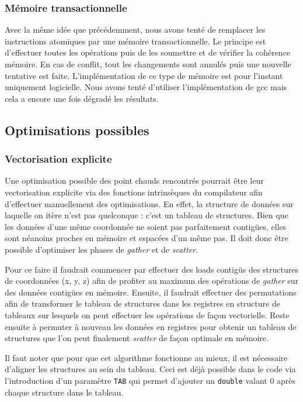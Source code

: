 \documentclass[11pt,a4paper]{article}
\begin{document}
			\subsubsection{Mémoire transactionnelle}
				Avec la même idée que précédemment, nous avons tenté de remplacer les instructions atomiques par une mémoire transactionnelle. Le principe est d'effectuer toutes les opérations puis de les soumettre et de vérifier la cohérence mémoire. En cas de conflit, tout les changements sont annulés puis une nouvelle tentative est faite. L'implémentation de ce type de mémoire est pour l'instant uniquement logicielle. Nous avons tenté d'utiliser l'implémentation de gcc mais cela a encore une fois dégradé les résultats.

		\subsection{Optimisations possibles}
			\subsubsection{Vectorisation explicite}
				Une optimisation possible des point chauds rencontrés pourrait être leur vectorisation explicite via des fonctions intrinsèques du compilateur afin d'effectuer manuellement des optimisations. En effet, la structure de données sur laquelle on itère n'est pas quelconque : c'est un tableau de structures. Bien que les données d'une même coordonnée ne soient pas parfaitement contigües, elles sont néanoins proches en mémoire et espacées d'un même pas. Il doit donc être possible d'optimiser les phases de \textit{gather} et de \textit{scatter}.

				Pour ce faire il faudrait commencer par effectuer des loads contigüs des structures de coordonnées (x, y, z) afin de profiter au maximum des opérations de \textit{gather} sur des données contigües en mémoire. Ensuite, il faudrait effectuer des permutations afin de transformer le tableau de structures dans les registres en structure de tableaux sur lesquels on peut effectuer les opérations de façon vectorielle. Reste ensuite à permuter à nouveau les données en registres pour obtenir un tableau de structures que l'on peut finalement \textit{scatter} de façon optimale en mémoire.

				Il faut noter que pour que cet algorithme fonctionne au mieux, il est nécessaire d'aligner les structures au sein du tableau. Ceci est déjà possible dans le code via l'introduction d'un paramètre \texttt{TAB} qui permet d'ajouter un \texttt{double} valant 0 après chaque structure dans le tableau.
\end{document}
